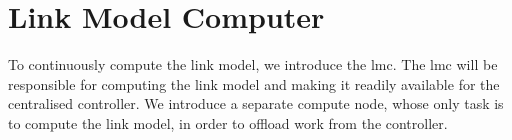 \section{Link Model Computer}\label{sec:mpi:lmc}
To continuously compute the link model, we introduce the \gls{lmc}. The \gls{lmc} will be responsible for computing the link model and making it readily available for the centralised controller. We introduce a separate compute node, whose only task is to compute the link model, in order to offload work from the controller.


